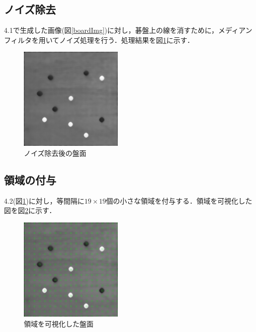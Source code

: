 \documentclass[openright]{nitocs}
\numberwithin{equation}{section}
\begin{document}
        \subsection{ノイズ除去}
            4.1で生成した画像(図\ref{boardImg})に対し，碁盤上の線を消すために，メディアンフィルタを用いてノイズ処理を行う．処理結果を図\ref{noiseReduced}に示す．
            \begin{figure} %
                \begin{center}
                \includegraphics[width=50mm,height=50mm]{noiseReducedImg.jpg} 
                \caption{ノイズ除去後の盤面}
                \label{noiseReduced}
                \end{center}
            \end{figure}

        \subsection{領域の付与}
            \label{area}
            4.2(図\ref{noiseReduced})に対し，等間隔に$19\times19$個の小さな領域を付与する．領域を可視化した図を図\ref{boardWithArea}に示す．
            \begin{figure} %
                \begin{center}
                \includegraphics[width=50mm,height=50mm]{boardWithAreaImg.jpg} 
                \caption{領域を可視化した盤面}
                \label{boardWithArea}
                \end{center}
            \end{figure}
\end{document}
